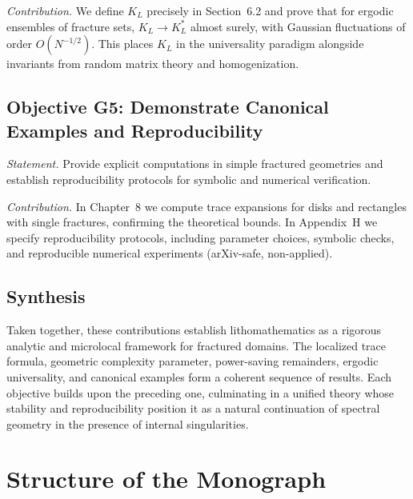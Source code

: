 \emph{Contribution.} We define $K_L$ precisely in Section~6.2 and prove
that for ergodic ensembles of fracture sets, $K_L \to K_L^*$ almost
surely, with Gaussian fluctuations of order $O(N^{-1/2})$. This places
$K_L$ in the universality paradigm alongside invariants from random
matrix theory and homogenization.

\subsection*{Objective G5: Demonstrate Canonical Examples and Reproducibility}

\emph{Statement.} Provide explicit computations in simple fractured
geometries and establish reproducibility protocols for symbolic and
numerical verification.

\emph{Contribution.} In Chapter~8 we compute trace expansions for disks
and rectangles with single fractures, confirming the theoretical bounds.
In Appendix~H we specify reproducibility protocols, including parameter
choices, symbolic checks, and reproducible numerical experiments
(arXiv-safe, non-applied).

\subsection*{Synthesis}

Taken together, these contributions establish lithomathematics as a
rigorous analytic and microlocal framework for fractured domains. The
localized trace formula, geometric complexity parameter, power-saving
remainders, ergodic universality, and canonical examples form a coherent
sequence of results. Each objective builds upon the preceding one,
culminating in a unified theory whose stability and reproducibility
position it as a natural continuation of spectral geometry in the
presence of internal singularities.


\section{Structure of the Monograph}

